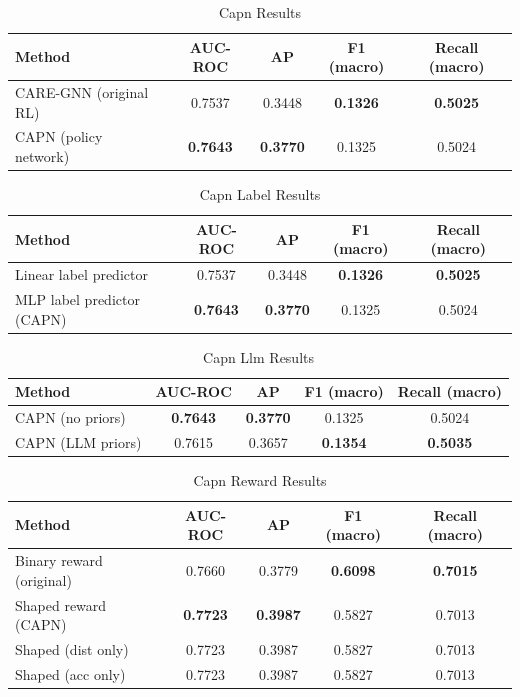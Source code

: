 \begin{table}[ht]
\centering
\caption{Capn Results}
\label{tab:capn}
\begin{tabular}{lcccc}
\toprule
Method & AUC-ROC & AP & F1 (macro) & Recall (macro) \\
\midrule
CARE-GNN (original RL) & 0.7537 & 0.3448 & \textbf{0.1326} & \textbf{0.5025} \\
CAPN (policy network) & \textbf{0.7643} & \textbf{0.3770} & 0.1325 & 0.5024 \\
\bottomrule
\end{tabular}
\end{table}

\begin{table}[ht]
\centering
\caption{Capn Label Results}
\label{tab:capn_label}
\begin{tabular}{lcccc}
\toprule
Method & AUC-ROC & AP & F1 (macro) & Recall (macro) \\
\midrule
Linear label predictor & 0.7537 & 0.3448 & \textbf{0.1326} & \textbf{0.5025} \\
MLP label predictor (CAPN) & \textbf{0.7643} & \textbf{0.3770} & 0.1325 & 0.5024 \\
\bottomrule
\end{tabular}
\end{table}

\begin{table}[ht]
\centering
\caption{Capn Llm Results}
\label{tab:capn_llm}
\begin{tabular}{lcccc}
\toprule
Method & AUC-ROC & AP & F1 (macro) & Recall (macro) \\
\midrule
CAPN (no priors) & \textbf{0.7643} & \textbf{0.3770} & 0.1325 & 0.5024 \\
CAPN (LLM priors) & 0.7615 & 0.3657 & \textbf{0.1354} & \textbf{0.5035} \\
\bottomrule
\end{tabular}
\end{table}

\begin{table}[ht]
\centering
\caption{Capn Reward Results}
\label{tab:capn_reward}
\begin{tabular}{lcccc}
\toprule
Method & AUC-ROC & AP & F1 (macro) & Recall (macro) \\
\midrule
Binary reward (original) & 0.7660 & 0.3779 & \textbf{0.6098} & \textbf{0.7015} \\
Shaped reward (CAPN) & \textbf{0.7723} & \textbf{0.3987} & 0.5827 & 0.7013 \\
Shaped (dist only) & 0.7723 & 0.3987 & 0.5827 & 0.7013 \\
Shaped (acc only) & 0.7723 & 0.3987 & 0.5827 & 0.7013 \\
\bottomrule
\end{tabular}
\end{table}

